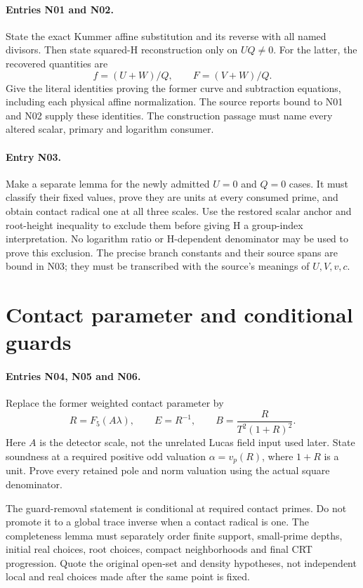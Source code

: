 \documentclass{article}
\begin{document}
\paragraph{Entries N01 and N02.}
State the exact Kummer affine substitution and its reverse with all named
divisors. Then state squared-H reconstruction only on $UQ\ne0$.
For the latter, the recovered quantities are
\[
 f=(U+W)/Q,\qquad F=(V+W)/Q.
\]
Give the literal identities proving the former curve and subtraction
equations, including each physical affine normalization. The source
reports bound to N01 and N02 supply these identities. The construction
passage must name every altered scalar, primary and logarithm consumer.

\paragraph{Entry N03.}
Make a separate lemma for the newly admitted $U=0$ and $Q=0$ cases.
It must classify their fixed values, prove they are units at every
consumed prime, and obtain contact radical one at all three scales.
Use the restored scalar anchor and root-height inequality to exclude
them before giving H a group-index interpretation. No logarithm ratio
or H-dependent denominator may be used to prove this exclusion.
The precise branch constants and their source spans are bound in N03;
they must be transcribed with the source's meanings of $U,V,v,c$.

\section{Contact parameter and conditional guards}
\label{outline:contact}
\paragraph{Entries N04, N05 and N06.}
Replace the former weighted contact parameter by
\[
 R=F_5(A\lambda),\qquad E=R^{-1},\qquad
 B=\frac{R}{T^2(1+R)^2}.
\]
Here $A$ is the detector scale, not the unrelated Lucas field input
used later. State soundness at a required positive odd valuation
$\alpha=v_p(R)$, where $1+R$ is a unit. Prove every retained pole and
norm valuation using the actual square denominator.

The guard-removal statement is conditional at required contact primes.
Do not promote it to a global trace inverse when a contact radical is one.
The completeness lemma must separately order finite support, small-prime
depths, initial real choices, root choices, compact neighborhoods and final
CRT progression. Quote the original open-set and density hypotheses,
not independent local and real choices made after the same point is fixed.
\end{document}
